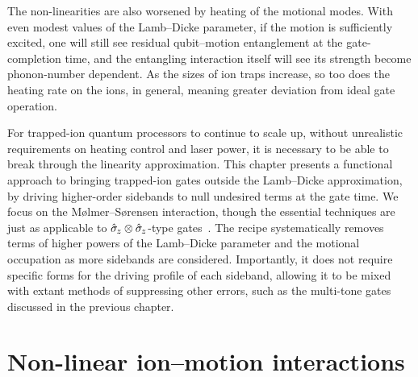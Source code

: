 The non-linearities are also worsened by heating of the motional modes.
With even modest values of the Lamb--Dicke parameter, if the motion is sufficiently excited, one will still see residual qubit--motion entanglement at the gate-completion time, and the entangling interaction itself will see its strength become phonon-number dependent.
As the sizes of ion traps increase, so too does the heating rate on the ions, in general, meaning greater deviation from ideal gate operation.

For trapped-ion quantum processors to continue to scale up, without unrealistic requirements on heating control and laser power, it is necessary to be able to break through the linearity approximation.
This chapter presents a functional approach to bringing trapped-ion gates outside the Lamb--Dicke approximation, by driving higher-order sidebands to null undesired terms at the gate time.
We focus on the M\o lmer--S\o rensen interaction, though the essential techniques are just as applicable to $\hat{\sigma}_{\mkern-1mu z}\otimes\hat{\sigma}_{\mkern-1mu z}$-type gates~\cite{Roos2008}.
The recipe systematically removes terms of higher powers of the Lamb--Dicke parameter and the motional occupation as more sidebands are considered.
Importantly, it does not require specific forms for the driving profile of each sideband, allowing it to be mixed with extant methods of suppressing other errors, such as the multi-tone gates discussed in the previous chapter.


\section{Non-linear ion--motion interactions}
\label{sec:beyondld-interaction}

